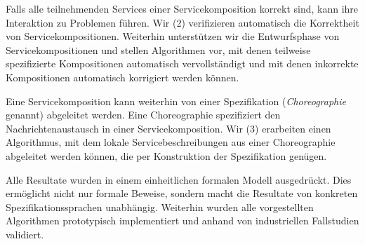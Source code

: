 Falls alle teilnehmenden Services einer Servicekomposition korrekt sind, kann ihre Interaktion zu Problemen f\"uhren. Wir (2) verifizieren automatisch die Korrektheit von Servicekompositionen. Weiterhin unterst\"utzen wir die Entwurfsphase von Servicekompositionen und stellen Algorithmen vor, mit denen teilweise spezifizierte Kompositionen automatisch vervollst\"andigt und mit denen inkorrekte Kompositionen automatisch korrigiert werden k\"onnen.

Eine Servicekomposition kann weiterhin von einer Spezifikation (\emph{Choreographie} genannt) abgeleitet werden. Eine Choreographie spezifiziert den Nachrichtenaustausch in einer Servicekomposition. Wir (3) erarbeiten einen Algorithmus, mit dem lokale Servicebeschreibungen aus einer Choreographie abgeleitet werden k\"onnen, die per Konstruktion der Spezifikation gen\"ugen.

Alle Resultate wurden in einem einheitlichen formalen Modell ausgedr\"uckt. Dies erm\"oglicht nicht nur formale Beweise, sondern macht die Resultate von konkreten Spezifikationssprachen unabh\"angig. Weiterhin wurden alle vorgestellten Algorithmen prototypisch implementiert und anhand von industriellen Fallstudien validiert.

